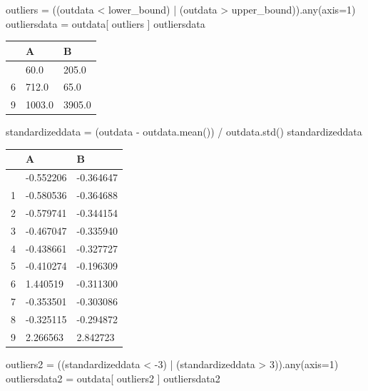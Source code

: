 \documentclass[
  a4paper,
  DIV=11,
  numbers=noendperiod]{scrreprt}
\newenvironment{Shaded}{\begin{snugshade}}{\end{snugshade}}
\newcommand{\BuiltInTok}[1]{\textcolor[rgb]{0.00,0.23,0.31}{#1}}
\newcommand{\DecValTok}[1]{\textcolor[rgb]{0.68,0.00,0.00}{#1}}
\newcommand{\NormalTok}[1]{\textcolor[rgb]{0.00,0.23,0.31}{#1}}
\newcommand{\OperatorTok}[1]{\textcolor[rgb]{0.37,0.37,0.37}{#1}}
\begin{document}
\begin{Shaded}
\begin{Highlighting}[]
\NormalTok{outliers }\OperatorTok{=}\NormalTok{ ((outdata }\OperatorTok{\textless{}}\NormalTok{ lower\_bound) }\OperatorTok{|}\NormalTok{ (outdata }\OperatorTok{\textgreater{}}\NormalTok{ upper\_bound)).}\BuiltInTok{any}\NormalTok{(axis}\OperatorTok{=}\DecValTok{1}\NormalTok{)}
\NormalTok{outliersdata }\OperatorTok{=}\NormalTok{ outdata[ outliers ]}
\NormalTok{outliersdata}
\end{Highlighting}
\end{Shaded}

\begin{longtable}[]{@{}lll@{}}
\toprule\noalign{}
& A & B \\
\midrule\noalign{}
\endhead
\bottomrule\noalign{}
\endlastfoot
5 & 60.0 & 205.0 \\
6 & 712.0 & 65.0 \\
9 & 1003.0 & 3905.0 \\
\end{longtable}

\begin{Shaded}
\begin{Highlighting}[]
\NormalTok{standardizeddata }\OperatorTok{=}\NormalTok{ (outdata }\OperatorTok{{-}}\NormalTok{ outdata.mean()) }\OperatorTok{/}\NormalTok{ outdata.std()}
\NormalTok{standardizeddata}
\end{Highlighting}
\end{Shaded}

\begin{longtable}[]{@{}lll@{}}
\toprule\noalign{}
& A & B \\
\midrule\noalign{}
\endhead
\bottomrule\noalign{}
\endlastfoot
0 & -0.552206 & -0.364647 \\
1 & -0.580536 & -0.364688 \\
2 & -0.579741 & -0.344154 \\
3 & -0.467047 & -0.335940 \\
4 & -0.438661 & -0.327727 \\
5 & -0.410274 & -0.196309 \\
6 & 1.440519 & -0.311300 \\
7 & -0.353501 & -0.303086 \\
8 & -0.325115 & -0.294872 \\
9 & 2.266563 & 2.842723 \\
\end{longtable}

\begin{Shaded}
\begin{Highlighting}[]
\NormalTok{outliers2 }\OperatorTok{=}\NormalTok{ ((standardizeddata }\OperatorTok{\textless{}} \OperatorTok{{-}}\DecValTok{3}\NormalTok{) }\OperatorTok{|}\NormalTok{ (standardizeddata }\OperatorTok{\textgreater{}} \DecValTok{3}\NormalTok{)).}\BuiltInTok{any}\NormalTok{(axis}\OperatorTok{=}\DecValTok{1}\NormalTok{)}
\NormalTok{outliersdata2 }\OperatorTok{=}\NormalTok{ outdata[ outliers2 ]}
\NormalTok{outliersdata2}
\end{Highlighting}
\end{Shaded}
\end{document}
